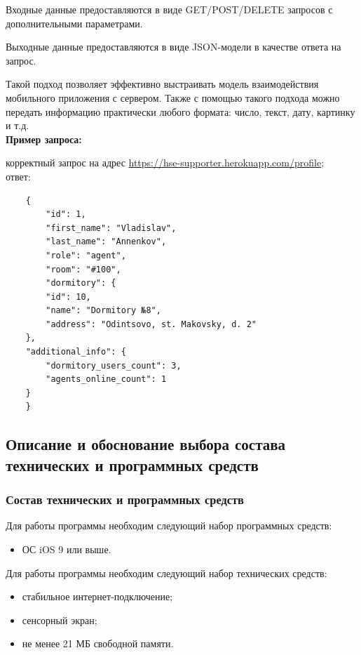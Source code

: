 \documentclass{../includes/TechDoc}
\begin{document}
    Входные данные предоставляются в виде GET/POST/DELETE запросов с дополнительными параметрами.

    Выходные данные предоставляются в виде JSON-модели в качестве ответа на запрос.

    Такой подход позволяет эффективно выстраивать модель взаимодействия мобильного приложения с сервером.
    Также с помощью такого подхода можно передать информацию практически любого формата: число, текст, дату, картинку и т.д.\\

    \noindent\textbf{Пример запроса:}

     корректный запрос на адрес \url{https://hse-supporter.herokuapp.com/profile};\\

     ответ:
    \begin{lstlisting}
    {
        "id": 1,
        "first_name": "Vladislav",
        "last_name": "Annenkov",
        "role": "agent",
        "room": "#100",
        "dormitory": {
        "id": 10,
        "name": "Dormitory №8",
        "address": "Odintsovo, st. Makovsky, d. 2"
    },
    "additional_info": {
        "dormitory_users_count": 3,
        "agents_online_count": 1
    }
    }
    \end{lstlisting}

    \clearpage

    \subsection{Описание и обоснование выбора состава технических и программных средств}

    \subsubsection{Состав технических и программных средств}

    Для работы программы необходим следующий набор программных средств:
    \begin{itemize}
        \item ОС iOS 9 или выше.
    \end{itemize}

    Для работы программы необходим следующий набор технических средств:
    \begin{itemize}
        \item стабильное интернет-подключение;
        \item сенсорный экран;
        \item не менее 21 МБ свободной памяти.
    \end{itemize}
\end{document}
